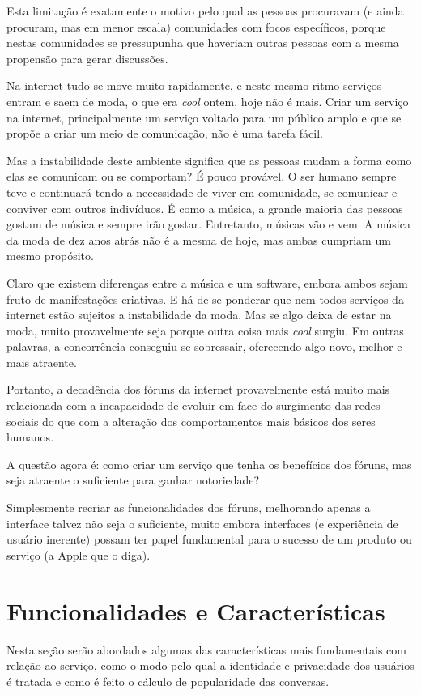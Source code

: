 \documentclass[diss]{template/setrem}
\begin{document}
Esta limitação é exatamente o motivo pelo qual as pessoas procuravam (e ainda procuram, mas em menor escala) comunidades com focos específicos, porque nestas comunidades se pressupunha que haveriam outras pessoas com a mesma propensão para gerar discussões.


Na internet tudo se move muito rapidamente, e neste mesmo ritmo serviços entram e saem de moda, o que era \emph{cool} ontem, hoje não é mais. Criar um serviço na internet, principalmente um serviço voltado para um público amplo e que se propõe a criar um meio de comunicação, não é uma tarefa fácil.

Mas a instabilidade deste ambiente significa que as pessoas mudam a forma como elas se comunicam ou se comportam? É pouco provável. O ser humano sempre teve e continuará tendo a necessidade de viver em comunidade, se comunicar e conviver com outros indivíduos. É como a música, a grande maioria das pessoas gostam de música e sempre irão gostar. Entretanto, músicas vão e vem. A música da moda de dez anos atrás não é a mesma de hoje, mas ambas cumpriam um mesmo propósito.

Claro que existem diferenças entre a música e um software, embora ambos sejam fruto de manifestações criativas. E há de se ponderar que nem todos serviços da internet estão sujeitos a instabilidade da moda. Mas se algo deixa de estar na moda, muito provavelmente seja porque outra coisa mais \emph{cool} surgiu. Em outras palavras, a concorrência conseguiu se sobressair, oferecendo algo novo, melhor e mais atraente.

Portanto, a decadência dos fóruns da internet provavelmente está muito mais relacionada com a incapacidade de evoluir em face do surgimento das redes sociais do que com a alteração dos comportamentos mais básicos dos seres humanos.

A questão agora é: como criar um serviço que tenha os benefícios dos fóruns, mas seja atraente o suficiente para ganhar notoriedade?

Simplesmente recriar as funcionalidades dos fóruns, melhorando apenas a interface talvez não seja o suficiente, muito embora interfaces (e experiência de usuário inerente) possam ter papel fundamental para o sucesso de um produto ou serviço (a Apple que o diga).

\section{Funcionalidades e Características}
Nesta seção serão abordados algumas das características mais fundamentais com relação ao serviço, como o modo pelo qual a identidade e privacidade dos usuários é tratada e como é feito o cálculo de popularidade das conversas. 
\end{document}
